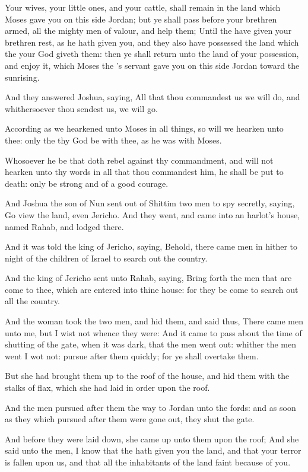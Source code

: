 \Verse Your wives, your little ones, and your cattle, shall remain in the land which Moses gave you on this side Jordan; but ye shall pass before your brethren armed, all the mighty men of valour, and help them; \Verse Until the \LORD have given your brethren rest, as he hath given you, and they also have possessed the land which the \LORD your God giveth them: then ye shall return unto the land of your possession, and enjoy it, which Moses the \LORD's servant gave you on this side Jordan toward the sunrising.

\Verse And they answered Joshua, saying, All that thou commandest us we will do, and whithersoever thou sendest us, we will go.

\Verse According as we hearkened unto Moses in all things, so will we hearken unto thee: only the \LORD thy God be with thee, as he was with Moses.

\Verse Whosoever he be that doth rebel against thy commandment, and will not hearken unto thy words in all that thou commandest him, he shall be put to death: only be strong and of a good courage.


\Chapter
\Verse And Joshua the son of Nun sent out of Shittim two men to spy secretly, saying, Go view the land, even Jericho. And they went, and came into an harlot's house, named Rahab, and lodged there.

\Verse And it was told the king of Jericho, saying, Behold, there came men in hither to night of the children of Israel to search out the country.

\Verse And the king of Jericho sent unto Rahab, saying, Bring forth the men that are come to thee, which are entered into thine house: for they be come to search out all the country.

\Verse And the woman took the two men, and hid them, and said thus, There came men unto me, but I wist not whence they were: \Verse And it came to pass about the time of shutting of the gate, when it was dark, that the men went out: whither the men went I wot not: pursue after them quickly; for ye shall overtake them.

\Verse But she had brought them up to the roof of the house, and hid them with the stalks of flax, which she had laid in order upon the roof.

\Verse And the men pursued after them the way to Jordan unto the fords: and as soon as they which pursued after them were gone out, they shut the gate.

\Verse And before they were laid down, she came up unto them upon the roof; \Verse And she said unto the men, I know that the \LORD hath given you the land, and that your terror is fallen upon us, and that all the inhabitants of the land faint because of you.

